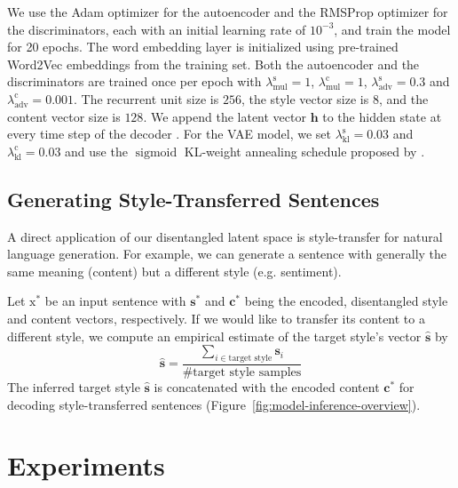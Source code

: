 \documentclass[letterpaper]{article} %
\newcommand{\rmx}{\mathrm x}
\newcommand{\hyp}[2]{\lambda_{\text{#1}}^{\text{#2}}}
\newcommand{\citeay}[1]{\citeauthor{#1} \shortcite{#1}}
\begin{document}
We use the Adam optimizer \cite{kingma2014adam} for the autoencoder and the RMSProp optimizer \cite{tieleman2012lecture} for the discriminators, each with an initial learning rate of $10^{-3}$, and train the model for 20 epochs.
The word embedding layer is initialized using pre-trained Word2Vec embeddings \cite{mikolov2013distributed} from the training set.
Both the autoencoder and the discriminators are trained once per epoch with $\hyp{mul}{s} = 1$, $\hyp{mul}{c} = 1$, $\hyp{adv}{s} = 0.3$ and $\hyp{adv}{c} = 0.001$.
The recurrent unit size is $256$, the style vector size is $8$, and the content vector size is $128$.
We append the latent vector $\bm h$ to the hidden state at every time step of the decoder \cite{bahuleyan2017variational}.
For the VAE model, we set $\hyp{kl}{s} = 0.03$ and $\hyp{kl}{c} = 0.03$ and use the $\operatorname{sigmoid}$ KL-weight annealing schedule proposed by \citeay{bahuleyan2018probabilistic}.


\subsection{Generating Style-Transferred Sentences} \label{ssec:sentence-generation}

A direct application of our disentangled latent space is style-transfer for natural language generation.
For example, we can generate a sentence with generally the same meaning (content) but a different style (e.g. sentiment).

Let $\rmx^*$ be an input sentence with $\bm s^*$ and $\bm c^*$ being the encoded, disentangled style and content vectors, respectively.
If we would like to transfer its content to a different style, we compute an empirical estimate of the target style's vector $\hat{\bm s}$ by
\begin{equation*}
	\hat{\bm s}=\frac{\sum_{i\in\text{target style}}\bm s_i}{\text{\# target style samples}}
\end{equation*}
The inferred target style $\hat{\bm s}$ is concatenated with the encoded content $\bm c^*$ for decoding style-transferred sentences (Figure~\ref{fig:model-inference-overview}).


\section{Experiments}
\end{document}
